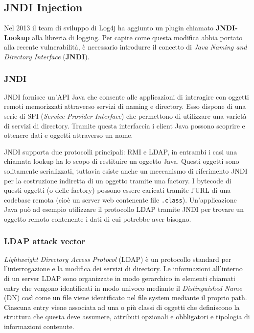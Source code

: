 \documentclass[a4paper, 12pt]{article}
\begin{document}
\subsection{JNDI Injection}
Nel 2013 il team di sviluppo di Log4j ha aggiunto un plugin chiamato \textbf{JNDI-Lookup} alla libreria di logging. Per capire come questa modifica abbia portato alla recente vulnerabilità, è necessario introdurre il concetto di \emph{Java Naming and Directory Interface} (\textbf{JNDI}).


\subsubsection{JNDI}
JNDI fornisce un'API Java che consente alle applicazioni di interagire con oggetti remoti memorizzati attraverso servizi di naming e directory.
Esso dispone di una serie di SPI (\emph{Service Provider Interface}) che permettono di utilizzare una varietà di servizi di directory.
Tramite questa interfaccia i client Java possono scoprire e ottenere dati e oggetti attraverso un nome. 

JNDI supporta due protocolli principali: RMI e LDAP, in entrambi i casi una chiamata lookup ha lo scopo di restituire un oggetto Java. Questi oggetti sono solitamente serializzati, tuttavia esiste anche un meccanismo di riferimento JNDI per la costruzione indiretta di un oggetto tramite una factory.
I bytecode di questi oggetti (o delle factory) possono essere caricati tramite l'URL di una codebase remota (cioè un server web contenente file \verb!.class!). Un'applicazione Java può ad esempio utilizzare il protocollo LDAP tramite JNDI per trovare un oggetto remoto contenente i dati di cui potrebbe aver bisogno.


\subsubsection{LDAP attack vector}
\emph{Lightweight Directory Access Protocol} (LDAP) è un protocollo standard per l'interrogazione e la modifica dei servizi di directory.
Le informazioni all’interno di un server LDAP sono organizzate in modo gerarchico in elementi chiamati entry che vengono identificati in modo univoco mediante il \emph{Distinguished Name} (DN) così come un file viene identificato nel file system mediante il proprio path. Ciascuna entry viene associata ad una o più classi di oggetti che definiscono la struttura che questa deve assumere, attributi opzionali e obbligatori e tipologia di informazioni contenute.
\end{document}
